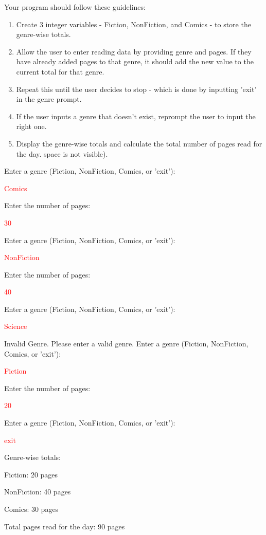 Your program should follow these guidelines:
\begin{enumerate}

 \item  Create 3 integer variables - Fiction, NonFiction, and Comics - to store the genre-wise totals.

 \item Allow the user to enter reading data by providing genre and pages. If they have already added pages to that genre, it should add the new value to the current total for that genre.

 \item Repeat this until the user decides to stop - which is done by inputting 'exit' in the genre prompt.

 \item If the user inputs a genre that doesn't exist, reprompt the user to input the right one.

 \item Display the genre-wise totals and calculate the total number of pages read for the day.
space is not visible).
\end{enumerate}
\begin{sample}
Enter a genre (Fiction, NonFiction, Comics, or 'exit'):

\textcolor{red}{Comics}

Enter the number of pages:

\textcolor{red}{30}

Enter a genre (Fiction, NonFiction, Comics, or 'exit'):

\textcolor{red}{NonFiction}

Enter the number of pages:

\textcolor{red}{40}

Enter a genre (Fiction, NonFiction, Comics, or 'exit'):

\textcolor{red}{Science}

Invalid Genre. Please enter a valid genre.
Enter a genre (Fiction, NonFiction, Comics, or 'exit'):

\textcolor{red}{Fiction}

Enter the number of pages:

\textcolor{red}{20}

Enter a genre (Fiction, NonFiction, Comics, or 'exit'):

\textcolor{red}{exit}

Genre-wise totals:

Fiction: 20 pages

NonFiction: 40 pages

Comics: 30 pages

Total pages read for the day: 90 pages

    
\end{sample}



